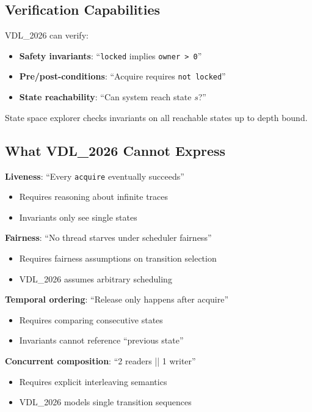 \documentclass[conference]{IEEEtran}
\begin{document}
\subsection{Verification Capabilities}

VDL\_2026 can verify:

\begin{itemize}
\item \textbf{Safety invariants}: ``\texttt{locked} implies \texttt{owner > 0}''
\item \textbf{Pre/post-conditions}: ``Acquire requires \texttt{not locked}''
\item \textbf{State reachability}: ``Can system reach state $s$?''
\end{itemize}

State space explorer checks invariants on all reachable states up to depth bound.

\subsection{What VDL\_2026 Cannot Express}

\textbf{Liveness}: ``Every \texttt{acquire} eventually succeeds''
\begin{itemize}
\item Requires reasoning about infinite traces
\item Invariants only see single states
\end{itemize}

\textbf{Fairness}: ``No thread starves under scheduler fairness''
\begin{itemize}
\item Requires fairness assumptions on transition selection
\item VDL\_2026 assumes arbitrary scheduling
\end{itemize}

\textbf{Temporal ordering}: ``Release only happens after acquire''
\begin{itemize}
\item Requires comparing consecutive states
\item Invariants cannot reference ``previous state''
\end{itemize}

\textbf{Concurrent composition}: ``2 readers || 1 writer''
\begin{itemize}
\item Requires explicit interleaving semantics
\item VDL\_2026 models single transition sequences
\end{itemize}
\end{document}
